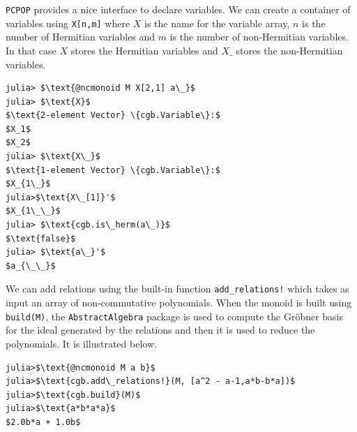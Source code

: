 \texttt{PCPOP} provides a nice interface to declare variables. We can create a container of variables using \texttt{X[n,m]} where $X$ is the name for the variable array,  $n$ is the number of Hermitian variables and $m$ is the number of non-Hermitian variables. In that case $X$ stores the Hermitian variables and $X\_$ stores the non-Hermitian variables. 
\begin{lstlisting}[style=code, mathescape=true]
julia> $\text{@ncmonoid M X[2,1] a\_}$ 
julia> $\text{X}$
$\text{2-element Vector} \{cgb.Variable\}:$
$X_1$
$X_2$
julia> $\text{X\_}$
$\text{1-element Vector} \{cgb.Variable\}:$
$X_{1\_}$
julia>$\text{X\_[1]}'$
$X_{1\_\_}$
julia> $\text{cgb.is\_herm(a\_)}$
$\text{false}$
julia> $\text{a\_}'$
$a_{\_\_}$

\end{lstlisting}
We can add relations using the built-in function \texttt{add\_relations!} which takes as input an array of non-commutative polynomials. When the monoid is built using \texttt{build(M)}, the \texttt{AbstractAlgebra} package is used to compute the Gr\"obner basis for the ideal generated by the relations and then it is used to reduce the polynomials. It is illustrated below.

\begin{lstlisting}[style=code, mathescape=true]
julia>$\text{@ncmonoid M a b}$
julia>$\text{cgb.add\_relations!}(M, [a^2 - a-1,a*b-b*a])$
julia>$\text{cgb.build}(M)$
julia>$\text{a*b*a*a}$
$2.0b*a + 1.0b$
\end{lstlisting}